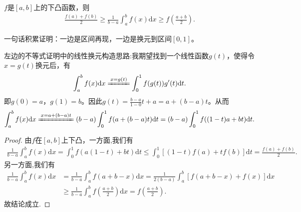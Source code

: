 \documentclass[../../main.tex]{subfiles}%
\begin{document}
\begin{theorem}[Hadamard不等式]\label{theorem:Hadamard不等式}
\(f\)是\([a,b]\)上的下凸函数，则
\begin{align*}
\frac{f(a)+f(b)}{2} \geqslant \frac{1}{b - a}\int_{a}^{b}f(x)\mathrm{d}x \geqslant f\left(\frac{a + b}{2}\right).
\end{align*} 
\end{theorem}
\begin{note}
一句话积累证明：一边是区间再现，一边是换元到区间\([0,1]\)。
\end{note}
\begin{remark}
左边的不等式证明中的线性换元构造思路:我期望找到一个线性函数$g(t)$，使得令$x = g(t)$换元后，有
\begin{align*}
\int_a^b f(x) \mathrm{d}x \xlongequal{x = g(t)} \int_0^1 f(g(t))g'(t) \mathrm{d}t.
\end{align*}
即$g(0) = a$，$g(1) = b$。因此$g(t) = \frac{b - a}{1 - 0}t + a = a + (b - a)t$。从而
\begin{align*}
\int_a^b f(x) \mathrm{d}x \xlongequal{x = a + (b - a)t} (b - a)\int_0^1 f(a + (b - a)t) \mathrm{d}t = (b - a)\int_0^1 f((1 - t)a + bt) \mathrm{d}t.
\end{align*} 
\end{remark}
\begin{proof}
由$f$在$[a,b]$上下凸，一方面,我们有
\begin{align*}
\frac{1}{b - a}\int_{a}^{b}f(x)\mathrm{d}x = \int_{0}^{1}f(a(1 - t)+bt)\mathrm{d}t \leqslant \int_{0}^{1}[(1 - t)f(a)+tf(b)]\mathrm{d}t = \frac{f(a)+f(b)}{2}.
\end{align*}
另一方面,我们有
\begin{align*}
\frac{1}{b - a}\int_{a}^{b}f(x)\mathrm{d}x &= \frac{1}{b - a}\int_{a}^{b}f(a + b - x)\mathrm{d}x
= \frac{1}{2(b - a)}\int_{a}^{b}[f(a + b - x)+f(x)]\mathrm{d}x\\
&\geqslant \frac{1}{b - a}\int_{a}^{b}f\left(\frac{a + b}{2}\right)\mathrm{d}x
= f\left(\frac{a + b}{2}\right).
\end{align*}
故结论成立.
\end{proof}
\end{document}
